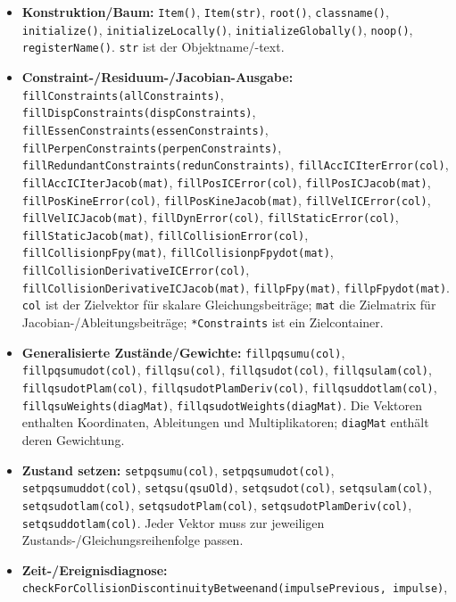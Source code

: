\documentclass[
  12pt
]{book}
\providecommand{\tightlist}{%
  \setlength{\itemsep}{0pt}\setlength{\parskip}{0pt}}
\begin{document}
\begin{itemize}
\tightlist
\item
  \textbf{Konstruktion/Baum:} \texttt{Item()}, \texttt{Item(str)},
  \texttt{root()}, \texttt{classname()}, \texttt{initialize()},
  \texttt{initializeLocally()}, \texttt{initializeGlobally()},
  \texttt{noop()}, \texttt{registerName()}. \texttt{str} ist der
  Objektname/-text.
\item
  \textbf{Constraint-/Residuum-/Jacobian-Ausgabe:}
  \texttt{fillConstraints(allConstraints)},
  \texttt{fillDispConstraints(dispConstraints)},
  \texttt{fillEssenConstraints(essenConstraints)},
  \texttt{fillPerpenConstraints(perpenConstraints)},
  \texttt{fillRedundantConstraints(redunConstraints)},
  \texttt{fillAccICIterError(col)}, \texttt{fillAccICIterJacob(mat)},
  \texttt{fillPosICError(col)}, \texttt{fillPosICJacob(mat)},
  \texttt{fillPosKineError(col)}, \texttt{fillPosKineJacob(mat)},
  \texttt{fillVelICError(col)}, \texttt{fillVelICJacob(mat)},
  \texttt{fillDynError(col)}, \texttt{fillStaticError(col)},
  \texttt{fillStaticJacob(mat)}, \texttt{fillCollisionError(col)},
  \texttt{fillCollisionpFpy(mat)}, \texttt{fillCollisionpFpydot(mat)},
  \texttt{fillCollisionDerivativeICError(col)},
  \texttt{fillCollisionDerivativeICJacob(mat)}, \texttt{fillpFpy(mat)},
  \texttt{fillpFpydot(mat)}. \texttt{col} ist der Zielvektor für skalare
  Gleichungsbeiträge; \texttt{mat} die Zielmatrix für
  Jacobian-/Ableitungsbeiträge; \texttt{*Constraints} ist ein
  Zielcontainer.
\item
  \textbf{Generalisierte Zustände/Gewichte:} \texttt{fillpqsumu(col)},
  \texttt{fillpqsumudot(col)}, \texttt{fillqsu(col)},
  \texttt{fillqsudot(col)}, \texttt{fillqsulam(col)},
  \texttt{fillqsudotPlam(col)}, \texttt{fillqsudotPlamDeriv(col)},
  \texttt{fillqsuddotlam(col)}, \texttt{fillqsuWeights(diagMat)},
  \texttt{fillqsudotWeights(diagMat)}. Die Vektoren enthalten
  Koordinaten, Ableitungen und Multiplikatoren; \texttt{diagMat} enthält
  deren Gewichtung.
\item
  \textbf{Zustand setzen:} \texttt{setpqsumu(col)},
  \texttt{setpqsumudot(col)}, \texttt{setpqsumuddot(col)},
  \texttt{setqsu(qsuOld)}, \texttt{setqsudot(col)},
  \texttt{setqsulam(col)}, \texttt{setqsudotlam(col)},
  \texttt{setqsudotPlam(col)}, \texttt{setqsudotPlamDeriv(col)},
  \texttt{setqsuddotlam(col)}. Jeder Vektor muss zur jeweiligen
  Zustands-/Gleichungsreihenfolge passen.
\item
  \textbf{Zeit-/Ereignisdiagnose:}
  \texttt{checkForCollisionDiscontinuityBetweenand(impulsePrevious,\ impulse)},

\end{itemize}
\end{document}
